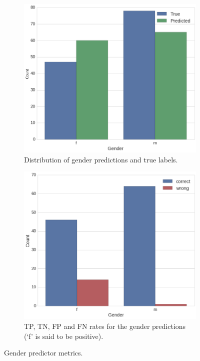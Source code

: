 \begin{figure}
\centering
\begin{subfigure}[b]{0.45\textwidth}
\includegraphics[width=\linewidth]{fig/gender_dist.png}
\caption{Distribution of gender predictions and true labels.}
\label{fig:gender_dist}
\end{subfigure}
\hspace{1em}
\begin{subfigure}[b]{0.45\textwidth}
\includegraphics[width=\linewidth]{fig/gender_error.png}
\caption{TP, TN, FP and FN rates for the gender predictions (`f' is said to be positive).}
\label{fig:gender_error}
\end{subfigure}
\caption{Gender predictor metrics.}
\label{fig:gender}
\end{figure}
  


